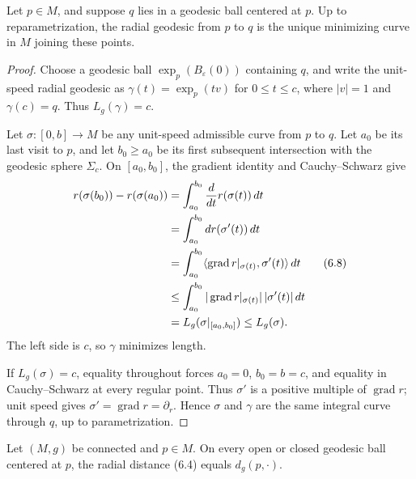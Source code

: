 \begin{proposition}
\label{prop:radial-geodesic-unique-minimizer}
\leanok

Let $p\in M$, and suppose $q$ lies in a geodesic ball centered at $p$.  Up to
reparametrization, the radial geodesic from $p$ to $q$ is the unique
minimizing curve in $M$ joining these points.
\end{proposition}

\begin{proof}
\sketch
Choose a geodesic ball $\exp_p(B_\varepsilon(0))$ containing $q$, and write
the unit-speed radial geodesic as
$\gamma(t)=\exp_p(tv)$ for $0\leq t\leq c$, where $|v|=1$ and
$\gamma(c)=q$.  Thus $L_g(\gamma)=c$.

Let $\sigma:[0,b]\to M$ be any unit-speed admissible curve from $p$ to $q$.
Let $a_0$ be its last visit to $p$, and let $b_0\geq a_0$ be its first
subsequent intersection with the geodesic sphere $\Sigma_c$.  On
$[a_0,b_0]$, the gradient identity and Cauchy--Schwarz give
\begin{align}
r(\sigma(b_0))-r(\sigma(a_0))
&=\int_{a_0}^{b_0}\frac{d}{dt}r(\sigma(t))\,dt \notag\\
&=\int_{a_0}^{b_0}dr(\sigma'(t))\,dt \notag\\
&=\int_{a_0}^{b_0}
\langle\operatorname{grad}r|_{\sigma(t)},\sigma'(t)\rangle\,dt \tag{6.8}\\
&\leq\int_{a_0}^{b_0}
|\operatorname{grad}r|_{\sigma(t)}|\,|\sigma'(t)|\,dt \notag\\
&=L_g(\sigma|_{[a_0,b_0]})\leq L_g(\sigma). \notag
\end{align}
The left side is $c$, so $\gamma$ minimizes length.

If $L_g(\sigma)=c$, equality throughout forces
$a_0=0$, $b_0=b=c$, and equality in Cauchy--Schwarz at every regular point.
Thus $\sigma'$ is a positive multiple of $\operatorname{grad}r$; unit speed
gives $\sigma'=\operatorname{grad}r=\partial_r$.  Hence $\sigma$ and $\gamma$
are the same integral curve through $q$, up to parametrization.
\end{proof}

\begin{corollary}
\label{cor:radial-distance-riemannian-distance}
\leanok
{}

Let $(M,g)$ be connected and $p\in M$.  On every open or closed geodesic ball
centered at $p$, the radial distance (6.4) equals $d_g(p,\mathord\cdot)$.
\end{corollary}

